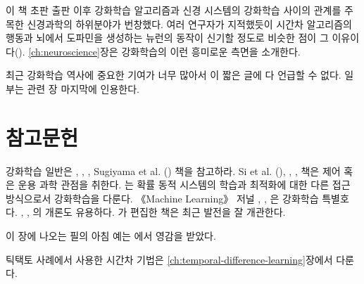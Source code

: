 이 책 초판 출판 이후 강화학습 알고리즘과 신경 시스템의 강화학습 사이의 관계를
주목한 신경과학의 하위분야가 번창했다. 여러 연구자가 지적했듯이 시간차
알고리즘의 행동과 뇌에서 도파민을 생성하는 뉴런의 동작이 신기할 정도로 비슷한
점이 그 이유이다(\cite{FristonEt1994, Barto1995a, HoukAdamsBarto1995,
MontagueDayanSejnowski1996, SchultzDayanMontague1997}).
\ref{ch:neuroscience}장은 강화학습의 이런 흥미로운 측면을 소개한다.

최근 강화학습 역사에 중요한 기여가 너무 많아서 이 짧은 글에 다 언급할 수 없다.
일부는 관련 장 마지막에 인용한다.

\section*{참고문헌}

강화학습 일반은 \textcite{Szepesvari2010}, \textcite{BertsekasTsitsiklis1996},
\textcite{Kaelbling1993a}, Sugiyama et al.
(\cite*{SugiyamaHachiyaMorimura2013}) 책을 참고하라. Si et al.
(\cite*{SiBartoPowellWunsch2004}), \textcite{Powell2011},
\textcite{LewisLiu2012}, \textcite{Bertsekas2012} 책은 제어 혹은 운용 과학
관점을 취한다. \textcite{Cao2009}는 확률 동적 시스템의 학습과 최적화에 대한 다른
접근 방식으로서 강화학습을 다룬다. 《Machine Learning》 저널
\textcite{Sutton1992}, \textcite{Kaelbling1996}, \textcite{Singh2002}은 강화학습
특별호다. \textcite{Barto1995b}, \textcite{KaelblingLittmanMoore1996},
\textcite{KeerthiRavindran1997}의 개론도 유용하다.
\textcite{WieringVanOtterlo2012}가 편집한 책은 최근 발전을 잘 개관한다.

\begin{description}[labelsep=2em]

\item[1.2]
이 장에 나오는 필의 아침 예는 \textcite{Agre1988}에서 영감을 받았다.

\item[1.5]
틱택토 사례에서 사용한 시간차 기법은 \ref{ch:temporal-difference-learning}장에서
다룬다.

\end{description}

